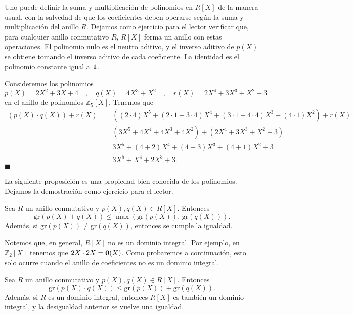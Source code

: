 Uno puede definir la suma y multiplicación de polinomios en $R[X]$ de la manera usual, con la salvedad de que los coeficientes deben operarse según la suma y multiplicación del anillo $R$. Dejamos como ejercicio para el lector verificar que, para cualquier anillo conmutativo $R$, $R[X]$ forma un anillo con estas operaciones. El polinomio nulo es el neutro aditivo, y el inverso aditivo de $p(X)$ se obtiene tomando el inverso aditivo de cada coeficiente. La identidad es el polinomio constante igual a $\mathbf{1}$.

\begin{example}
Consideremos los polinomios 
$$p(X) = 2X^2 + 3X + 4 \quad , \quad q(X) = 4X^3 + X^2 \quad , \quad r(X) = 2X^4 + 3X^3 + X^2 + 3$$
en el anillo de polinomios $\mathbb{Z}_5[X]$. Tenemos que
\begin{align*}
(p(X) \cdot q(X)) + r(X) &= \left((2 \cdot 4)X^5 + (2 \cdot 1 + 3 \cdot 4)X^4 + (3 \cdot 1 + 4 \cdot 4)X^3 + (4 \cdot 1)X^2 \right) + r(X) \\
&= (3X^5 + 4X^4 + 4X^3 + 4X^2) + (2X^4 + 3X^3 + X^2 + 3) \\
&= 3X^5 + (4 + 2)X^4 + (4 + 3)X^3 + (4 + 1)X^2 + 3 \\
&= 3X^5 + X^4 + 2X^3 + 3.
\end{align*}
\hfill$\blacksquare$
\end{example}

La siguiente proposición es una propiedad bien conocida de los polinomios. Dejamos la demostración como ejercicio para el lector.

\begin{proposition}
Sea $R$ un anillo conmutativo y $p(X), q(X) \in R[X]$. Entonces
$$\mathrm{gr}(p(X) + q(X)) \leq \max\left( \mathrm{gr}(p(X)),\, \mathrm{gr}(q(X))\right).$$
Además, si $\mathrm{gr}(p(X)) \neq \mathrm{gr}(q(X))$, entonces se cumple la igualdad.
\end{proposition}


Notemos que, en general, $R[X]$ no es un dominio integral. Por ejemplo, en $\mathbb{Z}_2[X]$ tenemos que $2X \cdot 2X = \mathbf{0}(X)$. Como probaremos a continuación, esto solo ocurre cuando el anillo de coeficientes no es un dominio integral.

\begin{proposition}
Sea $R$ un anillo conmutativo y $p(X), q(X) \in R[X]$. Entonces
$$\mathrm{gr}(p(X) \cdot q(X)) \leq \mathrm{gr}(p(X)) + \mathrm{gr}(q(X)).$$
Además, si $R$ es un dominio integral, entonces $R[X]$ es también un dominio integral, y la desigualdad anterior se vuelve una igualdad.
\end{proposition}

